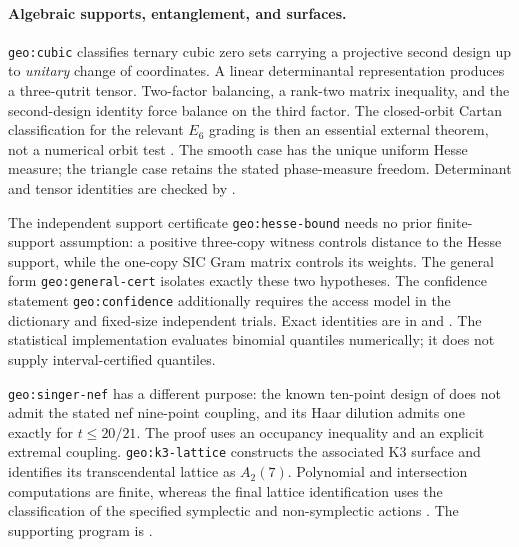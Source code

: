 \paragraph{Algebraic supports, entanglement, and surfaces.}
\texttt{geo:cubic} classifies ternary cubic zero sets carrying a
projective second design up to \emph{unitary} change of coordinates.
A linear determinantal representation produces a three-qutrit tensor.
Two-factor balancing, a rank-two matrix inequality, and the second-design
identity force balance on the third factor. The closed-orbit Cartan
classification for the relevant $E_6$ grading is then an essential
external theorem, not a numerical orbit test
\citep{geo_sauerwein2018,geo_ditrani2023}. The smooth case has the unique
uniform Hesse measure; the triangle case retains the stated phase-measure
freedom. Determinant and tensor identities are checked by
.

The independent support certificate \texttt{geo:hesse-bound} needs no
prior finite-support assumption: a positive three-copy witness controls
distance to the Hesse support, while the one-copy SIC Gram matrix
controls its weights. The general form \texttt{geo:general-cert}
isolates exactly these two hypotheses. The confidence statement
\texttt{geo:confidence} additionally requires the access model in the
dictionary and fixed-size independent trials. Exact identities are in
 and
.
The statistical implementation evaluates binomial quantiles numerically;
it does not supply interval-certified quantiles.

\texttt{geo:singer-nef} has a different purpose: the known ten-point
design of \citet{geo_iosue2024} does not admit the stated nef nine-point
coupling, and its Haar dilution admits one exactly for $t\le20/21$.
The proof uses an occupancy inequality and an explicit extremal coupling.
\texttt{geo:k3-lattice} constructs the associated K3 surface and
identifies its transcendental lattice as $A_2(7)$. Polynomial and
intersection computations are finite, whereas the final lattice
identification uses the classification of the specified symplectic and
non-symplectic actions
\citep{geo_garbagnati_sarti2007,geo_artebani_sarti_taki2011}.
The supporting program is
.

